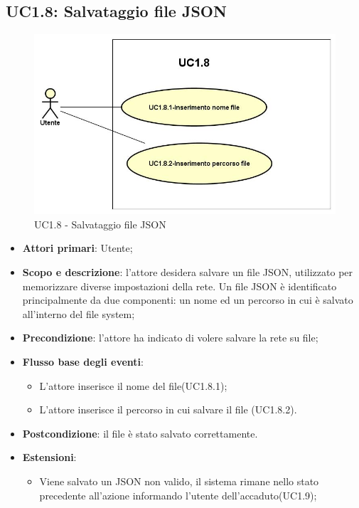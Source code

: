 \subsection{UC1.8: Salvataggio file JSON} 
\hypertarget{UC1.8}{} 
\begin{figure} [H]
	\centering
	\includegraphics[scale=0.45]{Img/UC1-8} 
	\caption{UC1.8 - Salvataggio file JSON} \label{} 
\end{figure} 
\begin{itemize} 
	\item{\textbf{Attori primari}: Utente;} 
	\item{\textbf{Scopo e descrizione}: l'attore desidera salvare un file JSON, utilizzato per memorizzare diverse impostazioni della rete. Un file JSON è identificato principalmente da due componenti: un nome ed un percorso in cui è salvato all'interno del file system;} 
	\item{\textbf{Precondizione}: l'attore ha indicato di volere salvare la rete su file;} 
	\item{\textbf{Flusso base degli eventi}: } 
	\begin{itemize} 
		\item{L'attore inserisce il nome del file(UC1.8.1);} 
		\item{L'attore inserisce il percorso in cui salvare il file (UC1.8.2).} 
	\end{itemize} 
	\item{\textbf{Postcondizione}: il file è stato salvato correttamente.} 
	\item \textbf{Estensioni}:
	\begin{itemize}
		\item Viene salvato un JSON non valido, il sistema rimane nello stato precedente all'azione informando l'utente dell'accaduto(UC1.9);
	\end{itemize}
\end{itemize} 
